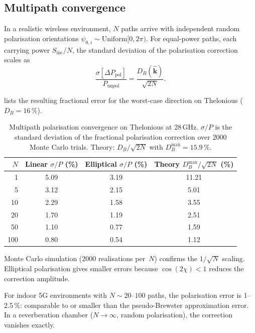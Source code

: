 \documentclass[11pt,a4paper]{article}
\theoremstyle{definition}      %
\newcommand{\khat}{\hat{\bm{k}}}
\newcommand{\Sinc}{S_{\mathrm{inc}}}
\begin{document}
\subsection{Multipath convergence}\label{sec:multipath-pol}

In a realistic wireless environment, $N$ paths arrive with
independent random polarisation orientations
$\psi_{0,i}\sim\mathrm{Uniform}[0,2\pi)$.  For equal-power paths,
each carrying power $\Sinc/N$, the standard deviation of the
polarisation correction scales as
\begin{equation}\label{eq:pol-convergence}
  \frac{\sigma[\Delta P_{\mathrm{pol}}]}{P_{\mathrm{unpol}}}
  = \frac{D_B(\khat)}{\sqrt{2N}}.
\end{equation}

 lists the resulting fractional error for
the worst-case direction on Thelonious ($D_B = 16\,\%$).

\begin{table}[!htbp]
\centering
\caption{Multipath polarisation convergence on Thelonious at 28\,GHz. $\sigma/P$ is the standard deviation of the fractional polarisation correction over 2000 Monte Carlo trials. Theory: $D_B/\!\sqrt{2N}$ with $D_B^{\max} = 15.9\,\%$.}\label{tab:multipath-pol}
\begin{tabular}{r c c c}
\toprule
$N$ & Linear $\sigma/P$ (\%) & Elliptical $\sigma/P$ (\%) & Theory $D_B^{\max}/\!\sqrt{2N}$ (\%) \\
\midrule
  1  & 5.09 & 3.19 & 11.21 \\
  5  & 3.12 & 2.15 & 5.01 \\
 10  & 2.29 & 1.58 & 3.55 \\
 20  & 1.70 & 1.19 & 2.51 \\
 50  & 1.10 & 0.77 & 1.59 \\
100  & 0.80 & 0.54 & 1.12 \\
\bottomrule
\end{tabular}
\end{table}

Monte Carlo simulation (2000 realisations per~$N$) confirms the
$1/\sqrt{N}$ scaling.  Elliptical polarisation gives smaller errors
because $\cos(2\chi)<1$ reduces the correction amplitude.

For indoor 5G environments with $N\sim 20$--$100$ paths, the
polarisation error is 1--2.5\,\%: comparable to or smaller than the
pseudo-Brewster approximation error.  In a reverberation chamber
($N\to\infty$, random polarisation), the correction vanishes exactly.
\end{document}
